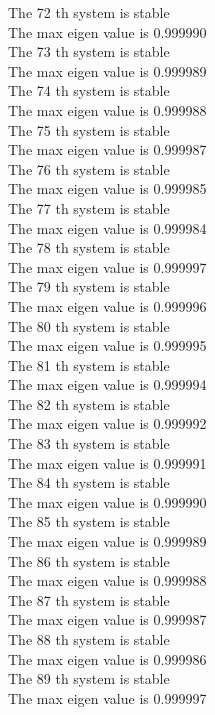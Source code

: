 \documentclass[11pt]{article}
\begin{document}
The 72 th system is stable \\
The max eigen value is 0.999990 \\
The 73 th system is stable \\
The max eigen value is 0.999989 \\
The 74 th system is stable \\
The max eigen value is 0.999988 \\
The 75 th system is stable \\
The max eigen value is 0.999987 \\
The 76 th system is stable \\
The max eigen value is 0.999985 \\
The 77 th system is stable \\
The max eigen value is 0.999984 \\
The 78 th system is stable \\
The max eigen value is 0.999997 \\
The 79 th system is stable \\
The max eigen value is 0.999996 \\
The 80 th system is stable \\
The max eigen value is 0.999995 \\
The 81 th system is stable \\
The max eigen value is 0.999994 \\
The 82 th system is stable \\
The max eigen value is 0.999992 \\
The 83 th system is stable \\
The max eigen value is 0.999991 \\
The 84 th system is stable \\
The max eigen value is 0.999990 \\
The 85 th system is stable \\
The max eigen value is 0.999989 \\
The 86 th system is stable \\
The max eigen value is 0.999988 \\
The 87 th system is stable \\
The max eigen value is 0.999987 \\
The 88 th system is stable \\
The max eigen value is 0.999986 \\
The 89 th system is stable \\
The max eigen value is 0.999997 \\
\end{document}
